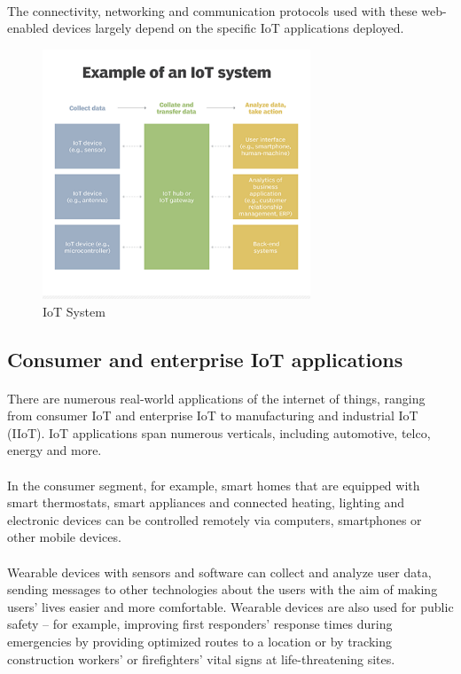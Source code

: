 \paragraph{}The connectivity, networking and communication protocols used with these web-enabled devices largely depend on the specific IoT applications deployed.
\begin{figure}[h]
	\centering
	\includegraphics[width=8cm]{./iot_archi}
	\caption{IoT System}
\end{figure}

\subsection{Consumer and enterprise IoT applications}
\paragraph{}There are numerous real-world applications of the internet of things, ranging from consumer IoT and enterprise IoT to manufacturing and industrial IoT (IIoT). IoT applications span numerous verticals, including automotive, telco, energy and more.
\paragraph{}In the consumer segment, for example, smart homes that are equipped with smart thermostats, smart appliances and connected heating, lighting and electronic devices can be controlled remotely via computers, smartphones or other mobile devices.
\paragraph{}Wearable devices with sensors and software can collect and analyze user data, sending messages to other technologies about the users with the aim of making users' lives easier and more comfortable. Wearable devices are also used for public safety -- for example, improving first responders' response times during emergencies by providing optimized routes to a location or by tracking construction workers' or firefighters' vital signs at life-threatening sites.
